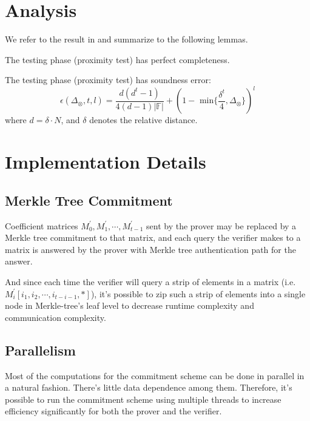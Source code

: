\section{Analysis}

We refer to the result in \cite{cryptoeprint:2020/1426} and summarize to the following lemmas. 

\begin{lemma}
\label{lemma:pc-completeness}
The testing phase (proximity test) has perfect completeness.
\end{lemma}

\begin{lemma}
\label{lemma:pc-soundness}
The testing phase (proximity test) has soundness error:
$$
    \epsilon(\Delta_\otimes, t, l) = \frac{d(d^t-1)}{4(d-1)|\mathbb{F}|} + (1 - \text{ min}\{\frac{\delta^t}{4}, \Delta_\otimes \})^l
$$
where $d = \delta \cdot N$, and $\delta$ denotes the relative distance.
\end{lemma}



\section{Implementation Details}

\subsection{Merkle Tree Commitment}

Coefficient matrices $M_0^\prime, M_1^\prime, \cdots, M_{t-1}^\prime$ sent by the prover may be replaced by a Merkle tree commitment to that matrix, and each query the verifier makes to a matrix is answered by the prover with Merkle tree authentication path for the answer.

And since each time the verifier will query a strip of elements in a matrix (i.e. $M_i^\prime[i_1, i_2, \cdots, i_{t-i-1}, *]$), it's possible to zip such a strip of elements into a single node in Merkle-tree's leaf level to decrease runtime complexity and communication complexity.

\subsection{Parallelism}

Most of the computations for the commitment scheme can be done in parallel in a natural fashion. There's little data dependence among them. Therefore, it's possible to run the commitment scheme using multiple threads to increase efficiency significantly for both the prover and the verifier.


